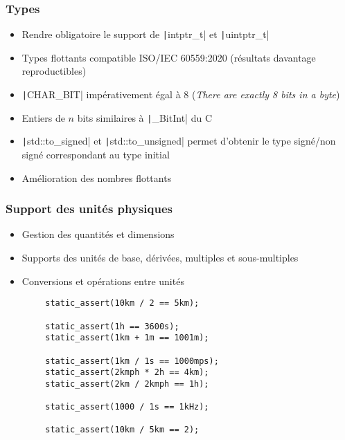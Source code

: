 \documentclass[C++.tex]{subfiles}
\begin{document}
\begin{frame}[fragile]
	\frametitle{Types}
	\begin{itemize}
		\item Rendre obligatoire le support de \texttt|intptr_t| et \texttt|uintptr_t|
		\item Types flottants compatible ISO/IEC 60559:2020 (résultats davantage reproductibles)
		\item \texttt|CHAR_BIT| impérativement égal à 8 (\textit{\og{}There are exactly 8 bits in a byte\fg{}})


		\item Entiers de $n$ bits similaires à \texttt|_BitInt| du C
		\item \texttt|std::to_signed| et \texttt|std::to_unsigned| permet d'obtenir le type signé/non signé correspondant au type initial
		\item Amélioration des nombres flottants
	\end{itemize}

\end{frame}

\begin{frame}[fragile]
	\frametitle{Support des unités physiques}
	\begin{itemize}
		\item Gestion des quantités et dimensions
		\item Supports des unités de base, dérivées, multiples et sous-multiples
		\item Conversions et opérations entre unités
	\end{itemize}

	\begin{verbatim}
		static_assert(10km / 2 == 5km);

		static_assert(1h == 3600s);
		static_assert(1km + 1m == 1001m);

		static_assert(1km / 1s == 1000mps);
		static_assert(2kmph * 2h == 4km);
		static_assert(2km / 2kmph == 1h);

		static_assert(1000 / 1s == 1kHz);

		static_assert(10km / 5km == 2);
	\end{verbatim}

\end{frame}
\end{document}
